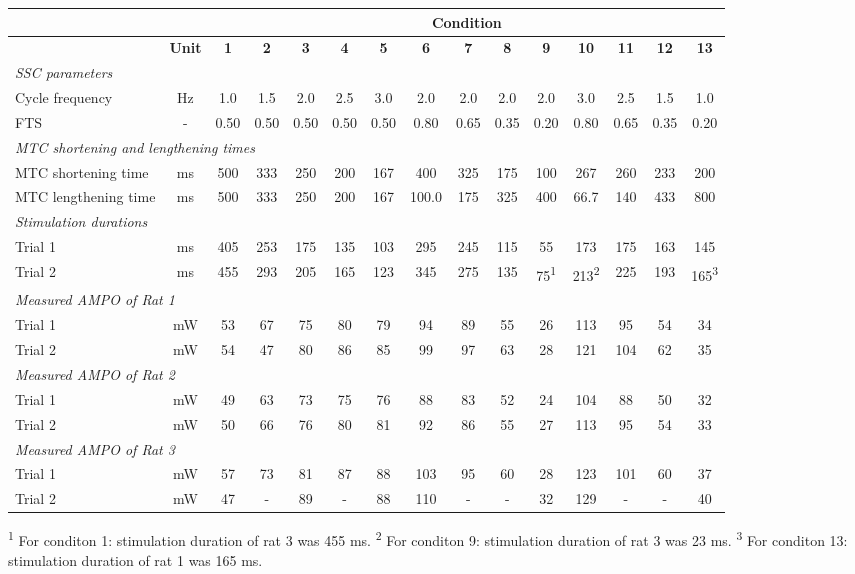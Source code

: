 \begin{tabular}{|l|c|c|c|c|c|c|c|c|c|c|c|c|c|c|} \hline
  & & \multicolumn{13}{c|}{Condition}  \\ \hline
  \bfseries & \bfseries Unit & \bfseries 1 & \bfseries 2 & \bfseries 3 & \bfseries 4 & \bfseries 5 & \bfseries 6 & \bfseries 7 & \bfseries 8 & \bfseries 9 & \bfseries 10 & \bfseries 11 & \bfseries 12 & \bfseries 13 \\ \hline
  \multicolumn{15}{|l|}{\itshape SSC parameters} \\ \hline
Cycle frequency & Hz & 1.0 & 1.5 & 2.0 & 2.5 & 3.0 & 2.0 & 2.0 & 2.0 & 2.0 & 3.0 & 2.5 & 1.5 & 1.0 \\ \hline
FTS & - & 0.50 & 0.50 & 0.50 & 0.50 & 0.50 & 0.80 & 0.65 & 0.35 & 0.20 & 0.80 & 0.65 & 0.35 & 0.20 \\ \hline
  \multicolumn{15}{|l|}{\itshape MTC shortening and lengthening times} \\ \hline
MTC shortening time & ms & 500 & 333 & 250 & 200 & 167 & 400 & 325 & 175 & 100 & 267 & 260 & 233 & 200 \\ \hline
MTC lengthening time & ms & 500 & 333 & 250 & 200 & 167 & 100.0 & 175 & 325 & 400 & 66.7 & 140 & 433 & 800 \\ \hline
  \multicolumn{15}{|l|}{\itshape Stimulation durations} \\ \hline
Trial 1 & ms & 405 & 253 & 175 & 135 & 103 & 295 & 245 & 115 & 55 & 173 & 175 & 163 & 145 \\ \hline
Trial 2 & ms & 455 & 293 & 205 & 165 & 123 & 345 & 275 & 135 & 75\textsuperscript{1} & 213\textsuperscript{2} & 225 & 193 & 165\textsuperscript{3} \\ \hline
  \multicolumn{15}{|l|}{\itshape Measured AMPO of Rat 1} \\ \hline
 Trial 1  & mW  & 53  & 67  & 75  & 80  & 79  & 94  & 89  & 55  & 26  & 113  & 95  & 54  & 34 \\ \hline 
 Trial 2  & mW  & 54  & 47  & 80  & 86  & 85  & 99  & 97  & 63  & 28  & 121  & 104  & 62  & 35 \\ \hline 
  \multicolumn{15}{|l|}{\itshape Measured AMPO of Rat 2} \\ \hline
 Trial 1  & mW  & 49  & 63  & 73  & 75  & 76  & 88  & 83  & 52  & 24  & 104  & 88  & 50  & 32 \\ \hline 
 Trial 2  & mW  & 50  & 66  & 76  & 80  & 81  & 92  & 86  & 55  & 27  & 113  & 95  & 54  & 33 \\ \hline 
  \multicolumn{15}{|l|}{\itshape Measured AMPO of Rat 3} \\ \hline
 Trial 1  & mW  & 57  & 73  & 81  & 87  & 88  & 103  & 95  & 60  & 28  & 123  & 101  & 60  & 37 \\ \hline 
 Trial 2  & mW  & 47  & -  & 89  & -  & 88  & 110  & -  & -  & 32  & 129  & -  & -  & 40 \\ \hline 
\end{tabular}\break\hfill\footnotesize{\textsuperscript{1} For conditon 1: stimulation duration of rat 3 was 455 ms. \textsuperscript{2} For conditon 9: stimulation duration of rat 3 was 23 ms. \textsuperscript{3} For conditon 13: stimulation duration of rat 1 was 165 ms.}